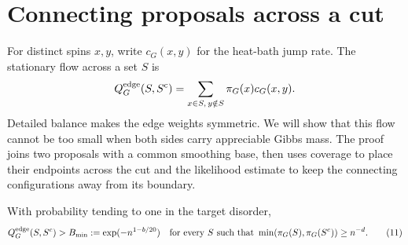 \section{Connecting proposals across a cut}\label{sec:connections}

For distinct spins $x,y$, write $c_G(x,y)$ for the heat-bath jump
rate. The stationary flow across a set $S$ is
\[
 Q_G^{\rm edge}(S,S^{\rm c})
 =\sum_{x\in S,\,y\notin S}\pi_G(x)c_G(x,y).
\]
Detailed balance makes the edge weights symmetric. We will show that
this flow cannot be too small when both sides carry appreciable
Gibbs mass. The proof joins two proposals with a common smoothing
base, then uses coverage to place their endpoints across the cut and
the likelihood estimate to keep the connecting configurations away
from its boundary.

\begin{proposition}\label{prop:cuts}
With probability tending to one in the target disorder,
\[
 Q_G^{\rm edge}(S,S^c)>B_{\min}:=\exp(-n^{1-b/20})
 \quad\text{for every }S\text{ such that }
 \min(\pi_G(S),\pi_G(S^c))\ge n^{-d}.
 \tag{11}\label{eq:11}
\]
\end{proposition}

